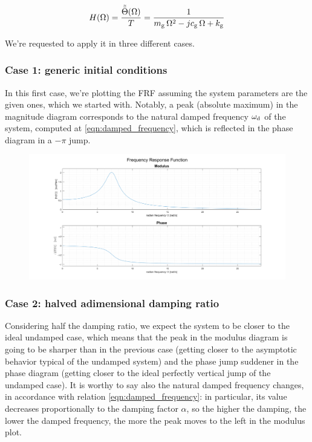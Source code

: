 \documentclass[a4paper,12pt,oneside]{article}
\begin{document}
\[
	H(\Omega) = \frac{\tilde{\bar{\Theta}}(\Omega)}{T} =
		\frac{1}{m_\textup{g} \, \Omega^2 - j c_\textup{g} \, \Omega + k_\textup{g}}
\]

We're requested to apply it in three different cases.

\subsubsection*{Case 1: generic initial conditions}

In this first case, we're plotting the FRF assuming the system parameters are the given ones, which we started with. Notably, a peak (absolute maximum) in the magnitude diagram corresponds to the natural damped frequency $ \omega_\textup{d} $ of the system, computed at \eqref{eqn:damped_frequency}, which is reflected in the phase diagram in a $ -\pi $ jump.

\clearpage

\begin{figure}[h]
	\hspace{-70pt}
	\includegraphics[scale=0.4]{frf}
\end{figure}

\vspace{-5pt}

\subsubsection*{Case 2: halved adimensional damping ratio}

Considering half the damping ratio, we expect the system to be closer to the ideal undamped case, which means that the peak in the modulus diagram is going to be sharper than in the previous case (getting closer to the asymptotic behavior typical of the undamped system) and the phase jump suddener in the phase diagram (getting closer to the ideal perfectly vertical jump of the undamped case). It is worthy to say also the natural damped frequency changes, in accordance with relation \eqref{eqn:damped_frequency}: in particular, its value decreases proportionally to the damping factor $ \alpha $, so the higher the damping, the lower the damped frequency, the more the peak moves to the left in the modulus plot.
\end{document}
